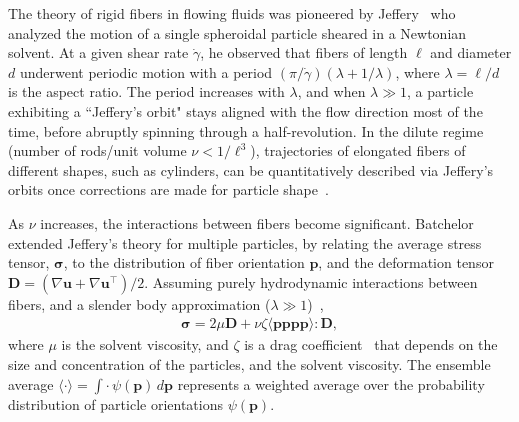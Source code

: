 \documentclass[preprint, 10pt]{elsarticle}
\begin{document}
The theory of rigid fibers in flowing fluids was pioneered by
Jeffery~\cite{Jeffery1922} who analyzed the motion of a single
spheroidal particle sheared in a Newtonian solvent. At a given shear
rate $\dot{\gamma}$, he observed that fibers of length $\ell$ and
diameter $d$ underwent periodic motion with a period $(\pi/\dot{\gamma})
(\lambda + 1/\lambda)$, where $\lambda = \ell/d$ is the aspect ratio.
The period increases with $\lambda$, and when $\lambda \gg 1$, a
particle exhibiting a ``Jeffery's orbit" stays aligned with the flow
direction most of the time, before abruptly spinning through a
half-revolution. In the dilute regime (number of rods/unit volume $\nu <
1/\ell^3$), trajectories of elongated fibers of different shapes, such
as cylinders, can be quantitatively described via Jeffery's orbits once
corrections are made for particle shape~\cite{Bretherton1962}.

As $\nu$ increases, the interactions between fibers become significant.
Batchelor extended Jeffery's theory for multiple particles, by relating
the average stress tensor, ${\bm \sigma}$, to the distribution of fiber
orientation $\mathbf{p}$, and the deformation tensor $\mathbf{D} =
(\nabla \mathbf{u} + \nabla \mathbf{u}^\intercal)/2$. Assuming purely
hydrodynamic interactions between fibers, and a slender body
approximation ($\lambda \gg 1$)~\cite{Batchelor1970, Batchelor1970a,
Doi1978, Dinh1984, Shaqfeh1990},
\begin{align}
  {\bm \sigma} = 2 \mu \mathbf{D} + \nu \zeta 
    \langle \mathbf{p p p p} \rangle : \mathbf{D},
\label{eqn:batchelor}
\end{align}
where $\mu$ is the solvent viscosity, and $\zeta$ is a drag
coefficient~\cite{Batchelor1971} that depends on the size and
concentration of the particles, and the solvent viscosity. The ensemble
average $\langle \cdot \rangle = \int \cdot \,
\psi(\mathbf{p})\,d\mathbf{p}$ represents a weighted average over the
probability distribution of particle orientations $\psi(\mathbf{p})$. 
\end{document}

